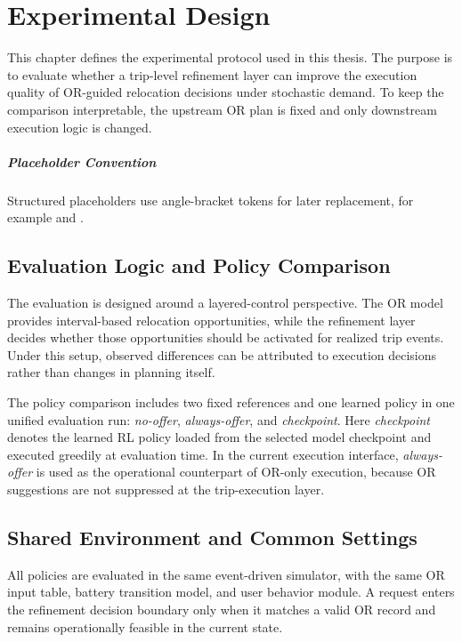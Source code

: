 \chapter{Experimental Design}

This chapter defines the experimental protocol used in this thesis. The purpose is to evaluate whether a trip-level refinement layer can improve the execution quality of OR-guided relocation decisions under stochastic demand. To keep the comparison interpretable, the upstream OR plan is fixed and only downstream execution logic is changed.

\paragraph{Placeholder Convention}
Structured placeholders use angle-bracket tokens for later replacement, for example \texttt{} and \texttt{}.

\section{Evaluation Logic and Policy Comparison}

The evaluation is designed around a layered-control perspective. The OR model provides interval-based relocation opportunities, while the refinement layer decides whether those opportunities should be activated for realized trip events. Under this setup, observed differences can be attributed to execution decisions rather than changes in planning itself.

The policy comparison includes two fixed references and one learned policy in one unified evaluation run: \textit{no-offer}, \textit{always-offer}, and \textit{checkpoint}. Here \textit{checkpoint} denotes the learned RL policy loaded from the selected model checkpoint and executed greedily at evaluation time.
In the current execution interface, \textit{always-offer} is used as the operational counterpart of OR-only execution, because OR suggestions are not suppressed at the trip-execution layer.

\section{Shared Environment and Common Settings}

All policies are evaluated in the same event-driven simulator, with the same OR input table, battery transition model, and user behavior module. A request enters the refinement decision boundary only when it matches a valid OR record and remains operationally feasible in the current state.

